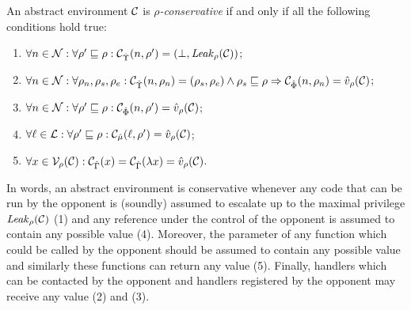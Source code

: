 \begin{definition}
\label{def:conservativeness}
An abstract environment ${\cal C}$ is \emph{$\rho$-conservative} if and only if all the following conditions hold true:
\begin{enumerate}
\item $\forall n \in \mathcal{N}: \forall \rho' \sqsubseteq \rho: {\cal C}_{\hat{\Upsilon}}(n,\rho') = (\bot,\mathit{Leak}_{\rho}({\cal C}))$;
\item $\forall n \in \mathcal{N}: \forall \rho_n,\rho_s,\rho_e: {\cal C}_{\hat{\Upsilon}}(n,\rho_n) = (\rho_s,\rho_e) \wedge \rho_s \sqsubseteq \rho \Rightarrow {\cal C}_{\hat{\Phi}}(n,\rho_n) = \hat{v}_{\rho}({\cal C})$;
\item $\forall n \in \mathcal{N}: \forall \rho' \sqsubseteq \rho: {\cal C}_{\hat{\Phi}}(n,\rho') = \hat{v}_{\rho}({\cal C})$;
\item $\forall \ell \in {\mathcal L}: \forall \rho' \sqsubseteq \rho: {\cal C}_{\hat{\mu}}(\ell,\rho') = \hat{v}_{\rho}({\cal C})$;
\item $\forall x \in \mathcal{V}_{\rho}({\cal C}): {\cal C}_{\hat{\Gamma}}(x) = {\cal C}_{\hat{\Gamma}}(\lambda x) = \hat{v}_{\rho}({\cal C})$.
\end{enumerate}
\end{definition}
In words, an abstract environment is conservative whenever 
any code that can be run by the opponent is (soundly) assumed to
escalate up to the maximal privilege $\mathit{Leak}_{\rho}({\cal C})$ (1) and
any reference under the control of the opponent is assumed to
contain any possible value (4). Moreover, the parameter of any function
which could be called by the opponent should be assumed to contain
any possible value and similarly these functions can return any value (5).
Finally, handlers which can be contacted by the opponent and handlers 
registered by the opponent may receive any value (2) and (3).

